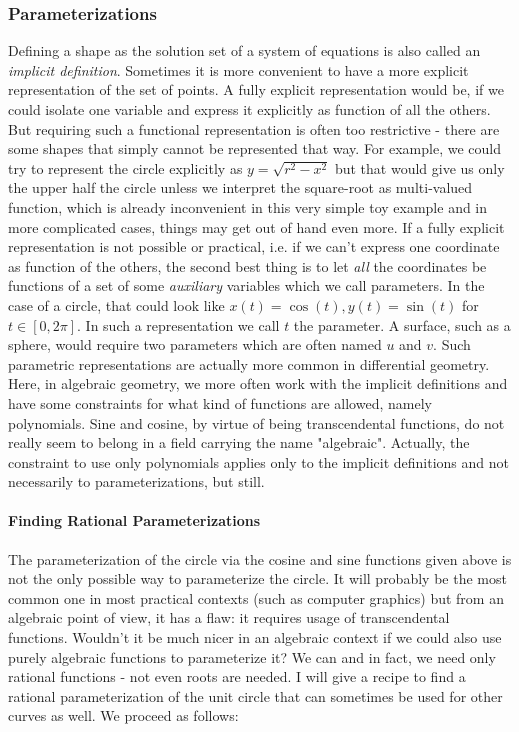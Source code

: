 \subsubsection{Parameterizations}
Defining a shape as the solution set of a system of equations is also called an \emph{implicit definition}. Sometimes it is more convenient to have a more explicit representation of the set of points. A fully explicit representation would be, if we could isolate one variable and express it explicitly as function of all the others. But requiring such a functional representation is often too restrictive - there are some shapes that simply cannot be represented that way. For example, we could try to represent the circle explicitly as $y = \sqrt{r^2 - x^2}$ but that would give us only the upper half the circle unless we interpret the square-root as multi-valued function, which is already inconvenient in this very simple toy example and in more complicated cases, things may get out of hand even more. If a fully explicit representation is not possible or practical, i.e. if we can't express one coordinate as function of the others, the second best thing is to let \emph{all} the coordinates be functions of a set of some \emph{auxiliary} variables which we call parameters. In the case of a circle, that could look like $x(t) = \cos(t), y(t) = \sin(t)$ for $t \in [0, 2 \pi]$. In such a representation we call $t$ the parameter. A surface, such as a sphere, would require two parameters which are often named $u$ and $v$. Such parametric representations are actually more common in differential geometry. Here, in algebraic geometry, we more often work with the implicit definitions and have some constraints for what kind of functions are allowed, namely polynomials. Sine and cosine, by virtue of being transcendental functions, do not really seem to belong in a field carrying the name "algebraic". Actually, the constraint to use only polynomials applies only to the implicit definitions and not necessarily to parameterizations, but still.


\paragraph{Finding Rational Parameterizations}
The parameterization of the circle via the cosine and sine functions given above is not the only possible way to parameterize the circle. It will probably be the most common one in most practical contexts (such as computer graphics) but from an algebraic point of view, it has a flaw: it requires usage of transcendental functions. Wouldn't it be much nicer in an algebraic context if we could also use purely algebraic functions to parameterize it? We can and in fact, we need only rational functions - not even roots are needed. I will give a recipe to find a rational parameterization of the unit circle that can sometimes be used for other curves as well. We proceed as follows:

